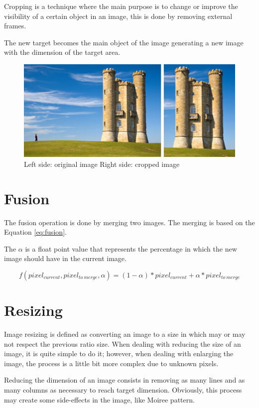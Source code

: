 \documentclass{article}
\begin{document}
	Cropping is a technique where the main purpose is to change or improve the visibility of a certain object in an image, 
	this is done by removing external frames. 

	The new target becomes the main object of the image generating a new image with the dimension of the target area.  

	\begin{figure}[H]
	\centering
	\includegraphics[scale=2]{images/crop}
	\caption{Left side: original image Right side: cropped image}
	\label{fig:cropping}
	\end{figure}


\section{Fusion}

	The fusion operation is done by merging two images. The merging is based on the Equation \ref{eq:fusion}. 
	
	The $\alpha$ is a float point value that represents the percentage in which the new image should have in the current image. 

	\begin{equation}
		f(pixel_{current},pixel_{to\ merge},\alpha)=(1-\alpha)*pixel_{current}+\alpha*pixel_{to\ merge}
		\label{eq:fusion}
	\end{equation}

\section{Resizing}

	Image resizing is defined as converting an image to a size in which may or may not respect the previous ratio size.
	When dealing with reducing the size of an image, it is quite simple to do it; however, when dealing with enlarging 
	the image, the process is a little bit more complex due to unknown pixels.

	Reducing the dimension of an image consists in removing as many lines and as many columns as necessary to reach target dimension. Obviously, this
	process may create some side-effects in the image, like Moiree pattern.
\end{document}
